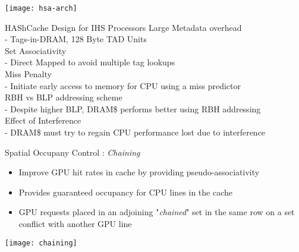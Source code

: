 \documentclass[final,t]{beamer}
\begin{document}
\begin{frame}[t,fragile]{}
\begin{columns}[t]
\begin{column}{.47\linewidth}
       \texttt{[image: hsa-arch]}
    \begin{exampleblock}{HAShCache Design for IHS Processors}
        \large Large Metadata overhead \\
        \normalsize \qquad- Tags-in-DRAM, 128 Byte TAD Units \\
        \large Set Associativity \\
        \normalsize \qquad- Direct Mapped to avoid multiple tag lookups \\
        \large Miss Penalty \\
        \normalsize \qquad- Initiate early access to memory for CPU using a miss predictor \\
        \large RBH vs BLP addressing scheme \\
        \normalsize \qquad- Despite higher BLP, DRAM\$ performs better using RBH addressing\\
        \large Effect of Interference \\
        \normalsize \qquad- DRAM\$ must try to regain CPU performance lost due to interference\\
    \end{exampleblock}
    
    \begin{exampleblock}{Spatial Occupany Control : \textit{Chaining}}
    \begin{itemize}
	    \item Improve GPU hit rates in cache by providing pseudo-associativity
	    \item Provides guaranteed occupancy for CPU lines in the cache
	    \item GPU requests placed in an adjoining "\textit{chained}" set in the same row on a set conflict with another GPU line
    \end{itemize}
    \end{exampleblock}
    
       \texttt{[image: chaining]}
    
\end{column}

\end{columns}

\end{frame}
\end{document}
